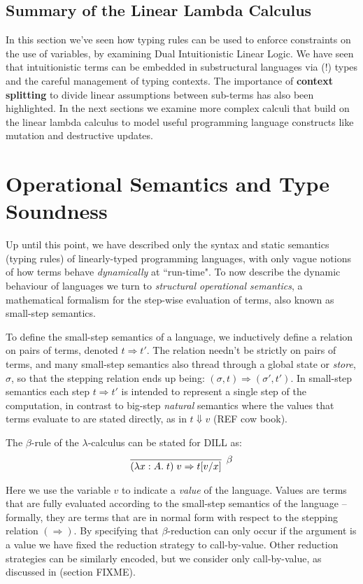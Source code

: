 \documentclass[]{unswthesis}
\newcommand{\steps}{\Rightarrow}
\let\i\textit
\let\b\textbf
\begin{document}
\subsection{Summary of the Linear Lambda Calculus}

In this section we've seen how typing rules can be used to enforce constraints on the use of variables, by examining Dual Intuitionistic Linear Logic. We have seen that intuitionistic terms can be embedded in substructural languages via (!) types and the careful management of typing contexts. The importance of \b{context splitting} to divide linear assumptions between sub-terms has also been highlighted. In the next sections we examine more complex calculi that build on the linear lambda calculus to model useful programming language constructs like mutation and destructive updates.

\section{Operational Semantics and Type Soundness}

Up until this point, we have described only the syntax and static semantics (typing rules) of linearly-typed programming languages, with only vague notions of how terms behave \i{dynamically} at ``run-time". To now describe the dynamic behaviour of languages we turn to \i{structural operational semantics}, a mathematical formalism for the step-wise evaluation of terms, also known as small-step semantics.

To define the small-step semantics of a language, we inductively define a relation on pairs of terms, denoted $t \steps t'$. The relation needn't be strictly on pairs of terms, and many small-step semantics also thread through a global state or \i{store}, $\sigma$, so that the stepping relation ends up being: $(\sigma, t) \steps (\sigma', t')$. In small-step semantics each step $t \steps t'$ is intended to represent a single step of the computation, in contrast to big-step \i{natural} semantics where the values that terms evaluate to are stated directly, as in $t \Downarrow v$ (REF cow book).

The $\beta$-rule of the $\lambda$-calculus can be stated for DILL as:
\begin{eqnarray*}
\infer[\beta]{(\lambda x : A. \; t) \; v \steps t[v/x]}{}
\end{eqnarray*}

Here we use the variable $v$ to indicate a \i{value} of the language. Values are terms that are fully evaluated according to the small-step semantics of the language \cite{tapl} -- formally, they are terms that are in normal form with respect to the stepping relation $(\steps)$. By specifying that $\beta$-reduction can only occur if the argument is a value we have fixed the reduction strategy to call-by-value. Other reduction strategies can be similarly encoded, but we consider only call-by-value, as discussed in (section FIXME).
\end{document}
